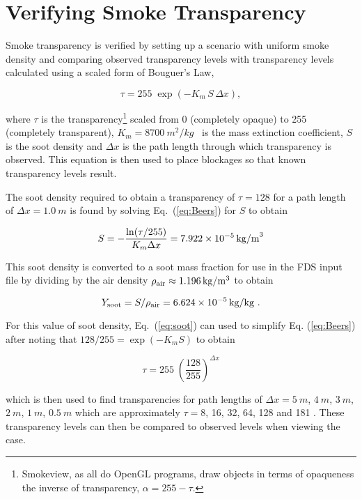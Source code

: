 \documentclass[11pt,twoside]{book}
\begin{document}
\section{Verifying Smoke Transparency}
\label{sect:verify_smoke}

Smoke transparency is verified by setting up a scenario with uniform smoke density and
comparing observed transparency
levels with transparency levels calculated using a scaled form of Bouguer's Law,

\begin{equation}
\tau = 255 \; \exp(-K_m \, S \, \Delta x),
\label{eq:Beers}
\end{equation}

\noindent where $\tau$ is the
transparency\footnote{Smokeview, as all do OpenGL programs, draw objects in terms of opaqueness the inverse of transparency, $\alpha = 255 - \tau$.}
scaled from 0 (completely opaque) to 255 (completely transparent), $K_m=\SI{8700}{m^2/kg}$~\cite{Mulholland:F+M} is the mass extinction coefficient, $S$ is the soot density and $\Delta x$ is the path length through which transparency is observed. This equation is then used to place blockages so that known transparency levels result.

The soot density required to obtain a transparency of $\tau=128$ for a path length of $\Delta x=\SI{1.0}{m}$ is found by solving Eq.~(\ref{eq:Beers}) for $S$ to obtain

\begin{equation}
S=-\frac{\ln(\tau/255)}{K_m\Delta x} = 7.922 \times 10^{-5}\,{\rm kg/m}^3
\label{eq:soot}
\end{equation}

\noindent This soot density is converted to a soot mass fraction for use in the FDS input file by dividing by the air density $\rho_{\rm air}\approx \SI{1.196}{kg/m^3}$ to obtain

\begin{equation}
Y_{\rm soot}=S/\rho_{\rm air}=6.624 \times 10^{-5}\,{\rm kg/kg}~.
\end{equation}

\noindent For this value of soot density, Eq.~(\ref{eq:soot}) can used to simplify Eq. (\ref{eq:Beers}) after noting that $128/255=\exp(-K_mS)$ to obtain

\begin{equation}
\tau = 255 \; \left(\frac{128}{255}\right)^{\Delta x}
\label{eq:Beers2}
\end{equation}

\noindent which is then used to find transparencies for path lengths of
$\Delta x=\SI{5}{m}$, $\SI{4}{m}$, $\SI{3}{m}$, $\SI{2}{m}$, $\SI{1}{m}$, $\SI{0.5}{m}$
which are approximately $\tau=8$, 16, 32, 64, 128 and 181 .
These transparency levels can then be compared to observed levels when viewing the case.
\end{document}
